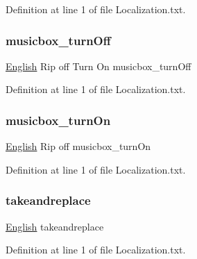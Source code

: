 Definition at line 1 of file Localization.\+txt.

\mbox{\label{0-_sphere_i_i_core_2_config_2_localization_8txt_abfaa31b1d849aeaf4567421bbd916aa4}} 
\subsubsection{\texorpdfstring{musicbox\_turnOff}{musicbox\_turnOff}}
{\footnotesize\ttfamily \mbox{\hyperlink{_sphere_i_i_01_winter_01_project_2_config_2_localization_8txt_ad896b63205779b1b09e86d941ce13976}{English}} Rip off Turn On musicbox\+\_\+turn\+Off}



Definition at line 1 of file Localization.\+txt.

\mbox{\label{0-_sphere_i_i_core_2_config_2_localization_8txt_aa0be4f08c7c98f1709fdd767f487560f}} 
\subsubsection{\texorpdfstring{musicbox\_turnOn}{musicbox\_turnOn}}
{\footnotesize\ttfamily \mbox{\hyperlink{_sphere_i_i_01_winter_01_project_2_config_2_localization_8txt_ad896b63205779b1b09e86d941ce13976}{English}} Rip off musicbox\+\_\+turn\+On}



Definition at line 1 of file Localization.\+txt.

\mbox{\label{0-_sphere_i_i_core_2_config_2_localization_8txt_a13d9a96b6e226395d376e176ba71e5bc}} 
\subsubsection{\texorpdfstring{takeandreplace}{takeandreplace}}
{\footnotesize\ttfamily \mbox{\hyperlink{_sphere_i_i_01_winter_01_project_2_config_2_localization_8txt_ad896b63205779b1b09e86d941ce13976}{English}} takeandreplace}



Definition at line 1 of file Localization.\+txt.

